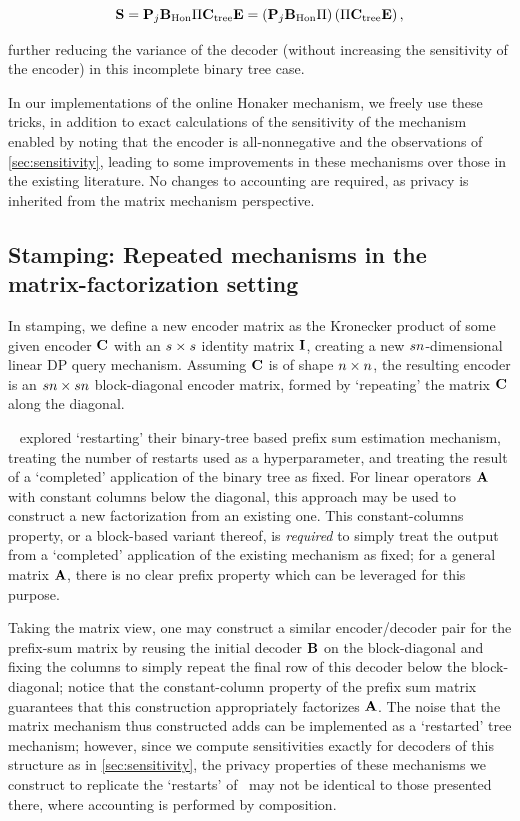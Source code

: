 \documentclass{article} %
\theoremstyle{named}
\begin{document}
$$\mathbf{S} = \mathbf{P}_j \mathbf{B}_{\text{Hon}} \Pi \mathbf{C}_{\text{tree}} \mathbf{E} = \left(\mathbf{P}_j \mathbf{B}_{\text{Hon}} \Pi\right)\left(\Pi \mathbf{C}_{\text{tree}} \mathbf{E}\right),$$

further reducing the variance of the decoder (without increasing the sensitivity of the encoder) in this incomplete binary tree case.

In our implementations of the online Honaker mechanism, we freely use these tricks, in addition to exact calculations of the sensitivity of the mechanism enabled by noting that the encoder is all-nonnegative and the observations of \cref{sec:sensitivity}, leading to some improvements in these mechanisms over those in the existing literature. No changes to accounting are required, as privacy is inherited from the matrix mechanism perspective.

\subsection{Stamping: Repeated mechanisms in the matrix-factorization setting}\label{app:ssec:repeated_mechs}

In stamping, we define a new encoder matrix as the Kronecker product of some given encoder $\mathbf{C}$ with an $s \times s$ identity matrix $\mathbf{I}$, creating a new $sn$-dimensional linear DP query mechanism. Assuming $\mathbf{C}$ is of shape $n \times n$, the resulting encoder is an $s n \times s n$ block-diagonal encoder matrix, formed by `repeating' the matrix $\mathbf{C}$ along the diagonal.

~\citet{kairouz2021practical} explored `restarting' their binary-tree based prefix sum estimation mechanism, treating the number of restarts used as a hyperparameter, and treating the result of a `completed' application of the binary tree as fixed. For linear operators $\mathbf{A}$ with constant columns below the diagonal, this approach may be used to construct a new factorization from an existing one. This constant-columns property, or a block-based variant thereof, is \emph{required} to simply treat the output from a `completed' application of the existing mechanism as fixed; for a general matrix $\mathbf{A}$, there is no clear prefix property which can be leveraged for this purpose.

Taking the matrix view, one may construct a similar encoder/decoder pair for the prefix-sum matrix by reusing the initial decoder $\mathbf{B}$ on the block-diagonal and fixing the columns to simply repeat the final row of this decoder below the block-diagonal; notice that the constant-column property of the prefix sum matrix guarantees that this construction appropriately factorizes $\mathbf{A}$. The noise that the matrix mechanism thus constructed adds can be implemented as a `restarted' tree mechanism; however, since we compute sensitivities exactly for decoders of this structure as in \cref{sec:sensitivity}, the privacy properties of these mechanisms we construct to replicate the `restarts' of~\citep{kairouz2021practical} may not be identical to those presented there, where accounting is performed by composition.
\end{document}
